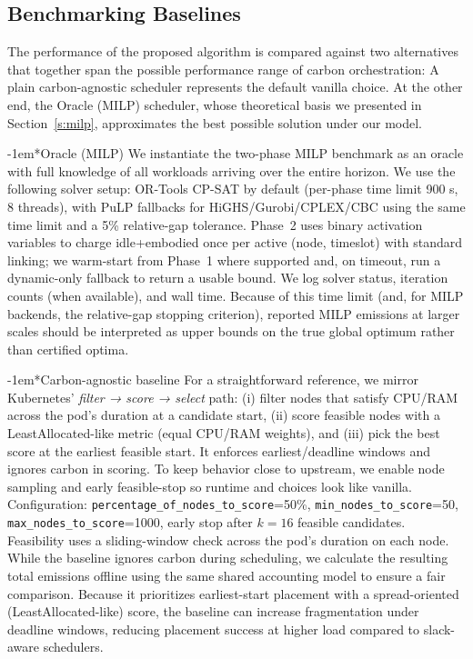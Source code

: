 \documentclass[10pt,journal,compsoc]{IEEEtran}
\makeatletter
\renewcommand{\paragraph}{\@startsection{paragraph}{4}{0pt}{1.5ex plus 1.5ex minus 0.5ex}%
{-1em}{\normalfont\normalsize\bfseries}}
\makeatother
\begin{document}
\subsection{Benchmarking Baselines}
\label{s:base}

The performance of the proposed algorithm is compared against two alternatives that together span the possible performance range of carbon orchestration: A plain carbon-agnostic scheduler represents the default vanilla choice. At the other end, the Oracle (MILP) scheduler, whose theoretical basis we presented in Section~\ref{s:milp}, approximates the best possible solution under our model.


\paragraph*{Oracle (MILP)} We instantiate the two-phase MILP benchmark as an oracle with full knowledge of all workloads arriving over the entire horizon. We use the following solver setup: OR-Tools CP-SAT by default (per-phase time limit 900 s, 8 threads), with PuLP fallbacks for HiGHS/Gurobi/CPLEX/CBC using the same time limit and a 5\% relative-gap tolerance. Phase~2 uses binary activation variables to charge idle+embodied once per active (node, timeslot) with standard linking; we warm-start from Phase~1 where supported and, on timeout, run a dynamic-only fallback to return a usable bound. We log solver status, iteration counts (when available), and wall time. Because of this time limit (and, for MILP backends, the relative-gap stopping criterion), reported MILP emissions at larger scales should be interpreted as upper bounds on the true global optimum rather than certified optima.

\paragraph*{Carbon-agnostic baseline} For a straightforward reference, we mirror Kubernetes’ \emph{filter → score → select} path: (i) filter nodes that satisfy CPU/RAM across the pod’s duration at a candidate start, (ii) score feasible nodes with a LeastAllocated-like metric (equal CPU/RAM weights), and (iii) pick the best score at the earliest feasible start. It enforces earliest/deadline windows and ignores carbon in scoring. To keep behavior close to upstream, we enable node sampling and early feasible-stop so runtime and choices look like vanilla. Configuration: \texttt{percentage\_of\_nodes\_to\_score}=50\%, \texttt{min\_nodes\_to\_score}=50, \texttt{max\_nodes\_to\_score}=1000, early stop after \(k=16\) feasible candidates. Feasibility uses a sliding-window check across the pod’s duration on each node. While the baseline ignores carbon during scheduling, we calculate the resulting total emissions offline using the same shared accounting model to ensure a fair comparison.
Because it prioritizes earliest-start placement with a spread-oriented (LeastAllocated-like) score, the baseline can increase fragmentation under deadline windows, reducing placement success at higher load compared to slack-aware schedulers.
\end{document}
